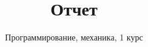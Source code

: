 ﻿\thispagestyle{empty}
 
\title{Отчет}
\author{Программирование, механика, 1 курс}
\maketitle

\tableofcontents

\newpage

\listoffigures
